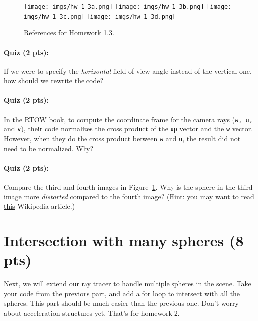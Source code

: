 \begin{figure}[ht]
    \centering
    \texttt{[image: imgs/hw\_1\_3a.png]}
    \texttt{[image: imgs/hw\_1\_3b.png]}
    \texttt{[image: imgs/hw\_1\_3c.png]}
    \texttt{[image: imgs/hw\_1\_3d.png]}
    \caption{References for Homework 1.3.}
    \label{fig:hw_1_3}
\end{figure}

\paragraph{Quiz (2 pts):} If we were to specify the \emph{horizontal} field of view angle instead of the vertical one, how should we rewrite the code?

\paragraph{Quiz (2 pts):} In the RTOW book, to compute the coordinate frame for the camera rays (\lstinline{w, u,} and \lstinline{v}), their code normalizes the cross product of the \lstinline{up} vector and the \lstinline{w} vector. However, when they do the cross product between \lstinline{w} and \lstinline{u}, the result did not need to be normalized. Why?

\paragraph{Quiz (2 pts):} Compare the third and fourth images in Figure~\ref{fig:hw_1_3}. Why is the sphere in the third image more \emph{distorted} compared to the fourth image? (Hint: you may want to read \href{https://en.wikipedia.org/wiki/Perspective_distortion}{this} Wikipedia article.)

\section{Intersection with many spheres (8 pts)}
Next, we will extend our ray tracer to handle multiple spheres in the scene. Take your code from the previous part, and add a for loop to intersect with all the spheres. This part should be much easier than the previous one. Don't worry about acceleration structures yet. That's for homework 2.

